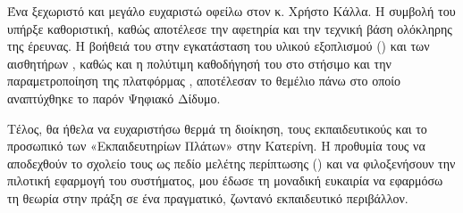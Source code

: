 Ένα ξεχωριστό και μεγάλο ευχαριστώ οφείλω στον κ. Χρήστο Κάλλα. Η συμβολή του υπήρξε καθοριστική, καθώς
αποτέλεσε την αφετηρία και την τεχνική βάση ολόκληρης της έρευνας. Η βοήθειά του στην εγκατάσταση του υλικού
εξοπλισμού () και των αισθητήρων , καθώς και η πολύτιμη καθοδήγησή του στο στήσιμο και την
παραμετροποίηση της πλατφόρμας , αποτέλεσαν το θεμέλιο πάνω στο οποίο αναπτύχθηκε το παρόν Ψηφιακό
Δίδυμο.

Τέλος, θα ήθελα να ευχαριστήσω θερμά τη διοίκηση, τους εκπαιδευτικούς και το προσωπικό των «Εκπαιδευτηρίων
Πλάτων» στην Κατερίνη. Η προθυμία τους να αποδεχθούν το σχολείο τους ως πεδίο μελέτης περίπτωσης
() και να φιλοξενήσουν την πιλοτική εφαρμογή του συστήματος, μου έδωσε τη μοναδική ευκαιρία να
εφαρμόσω τη θεωρία στην πράξη σε ένα πραγματικό, ζωντανό εκπαιδευτικό περιβάλλον.

\clearpage


